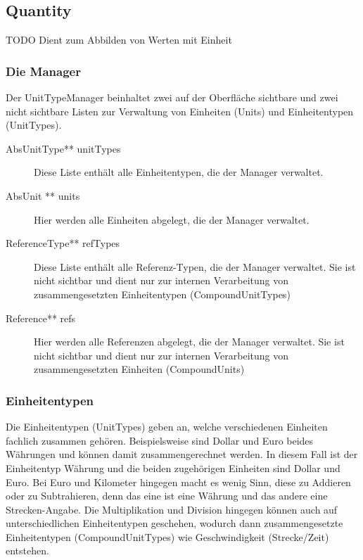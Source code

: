 \subsection{Quantity}
TODO Dient zum Abbilden von Werten mit Einheit

\subsubsection{Die Manager}

Der UnitTypeManager beinhaltet zwei auf der Oberfläche sichtbare und zwei nicht sichtbare Listen zur Verwaltung von Einheiten (Units) und Einheitentypen (UnitTypes).

\begin{description}
\item[AbsUnitType** unitTypes] Diese Liste enthält alle Einheitentypen, die der Manager verwaltet.
\item[AbsUnit ** units] Hier werden alle Einheiten abgelegt, die der Manager verwaltet.
\item[ReferenceType** refTypes] Diese Liste enthält alle Referenz-Typen, die der Manager verwaltet. Sie ist nicht sichtbar und dient nur zur internen Verarbeitung von zusammengesetzten Einheitentypen (CompoundUnitTypes)
\item[Reference** refs] Hier werden alle Referenzen abgelegt, die der Manager verwaltet. Sie ist nicht sichtbar und dient nur zur internen Verarbeitung von zusammengesetzten Einheiten (CompoundUnits)
\end{description}


\subsubsection{Einheitentypen}
Die Einheitentypen (UnitTypes) geben an, welche verschiedenen Einheiten fachlich zusammen gehören. Beispielsweise sind Dollar und Euro beides Währungen und können damit zusammengerechnet werden. In diesem Fall ist der Einheitentyp Währung und die beiden zugehörigen Einheiten sind Dollar und Euro. Bei Euro und Kilometer hingegen macht es wenig Sinn, diese zu Addieren oder zu Subtrahieren, denn das eine ist eine Währung und das andere eine Strecken-Angabe. Die Multiplikation und Division hingegen können auch auf unterschiedlichen Einheitentypen geschehen, wodurch dann zusammengesetzte Einheitentypen (CompoundUnitTypes) wie Geschwindigkeit (Strecke/Zeit) entstehen.

